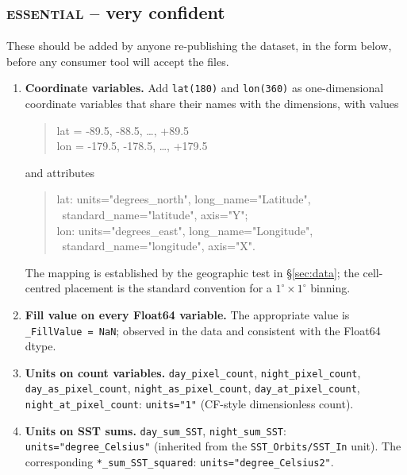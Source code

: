 \documentclass[11pt]{article}
\newcommand{\vc}{\textbf{very confident}}
\newcommand{\es}{\textsc{essential}}
\begin{document}
\subsection{\es{} -- \vc{}}\label{sec:es-vc}

These should be added by anyone re-publishing the dataset, in the
form below, before any consumer tool will accept the files.

\begin{enumerate}
  \item \textbf{Coordinate variables.} Add
    \texttt{lat(180)} and \texttt{lon(360)} as one-dimensional
    coordinate variables that share their names with the
    dimensions, with values
    \begin{quote}\ttfamily
      lat = -89.5, -88.5, \ldots, +89.5 \\
      lon = -179.5, -178.5, \ldots, +179.5
    \end{quote}
    and attributes
    \begin{quote}\ttfamily
      lat: units="degrees\_north", long\_name="Latitude",\\
      \phantom{lat:}\ standard\_name="latitude", axis="Y";\\
      lon: units="degrees\_east",  long\_name="Longitude",\\
      \phantom{lon:}\ standard\_name="longitude", axis="X".
    \end{quote}
    The mapping is established by the geographic test in
    \S\ref{sec:data}; the cell-centred placement is the standard
    convention for a $1^\circ \times 1^\circ$ binning.

  \item \textbf{Fill value on every Float64 variable.} The
    appropriate value is \texttt{\_FillValue = NaN}; observed in
    the data and consistent with the Float64 dtype.

  \item \textbf{Units on count variables.}
    \texttt{day\_pixel\_count}, \texttt{night\_pixel\_count},
    \texttt{day\_as\_pixel\_count}, \texttt{night\_as\_pixel\_count},
    \texttt{day\_at\_pixel\_count}, \texttt{night\_at\_pixel\_count}:
    \texttt{units="1"} (CF-style dimensionless count).

  \item \textbf{Units on SST sums.}
    \texttt{day\_sum\_SST}, \texttt{night\_sum\_SST}:
    \texttt{units="degree\_Celsius"} (inherited from the
    \texttt{SST\_Orbits/SST\_In} unit). The corresponding
    \texttt{*\_sum\_SST\_squared}: \texttt{units="degree\_Celsius2"}.


\end{enumerate}
\end{document}
